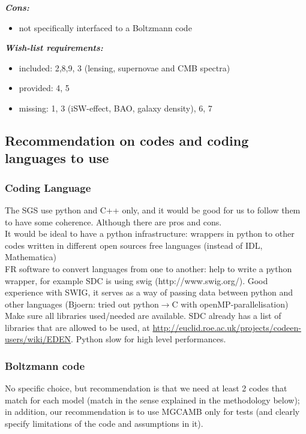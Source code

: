 {\it \bf Cons:} 
\begin{itemize}
 \item not specifically interfaced to a Boltzmann code
\end{itemize}

{\it \bf Wish-list requirements: }
\begin{itemize}
\item{included: 2,8,9, 3 (lensing, supernovae and CMB spectra)}
\item{provided: 4, 5}
\item{missing: 1, 3 (iSW-effect, BAO, galaxy density), 6, 7}
\end{itemize}

\newpage
\subsection{Recommendation on codes and coding languages to use}

\subsubsection{Coding Language}
The SGS use python and C++ only, and it would be good for us to follow them to have some coherence. Although there are pros and cons.\\
It would be ideal to have a python infrastructure: wrappers in python to other codes written in different open sources free languages (instead of IDL, Mathematica)\\
FR software to convert languages from one to another: help to write a python wrapper, for example SDC is using swig (http://www.swig.org/).
Good experience with SWIG, it serves as a way of passing data between python and other languages (Bjoern: tried out python$\rightarrow$C with openMP-parallelisation)\\
Make sure all libraries used/needed are available. 
SDC already has a list of libraries that are allowed to be used, at \url{http://euclid.roe.ac.uk/projects/codeen-users/wiki/EDEN}.
Python slow for high level performances. 

\subsubsection{Boltzmann code}

No specific choice, but recommendation is that we need at least 2 codes that match for each model (match in the sense explained in the methodology below); 
in addition, our recommendation is to use MGCAMB only for tests (and clearly specify limitations of the code and assumptions in it).


